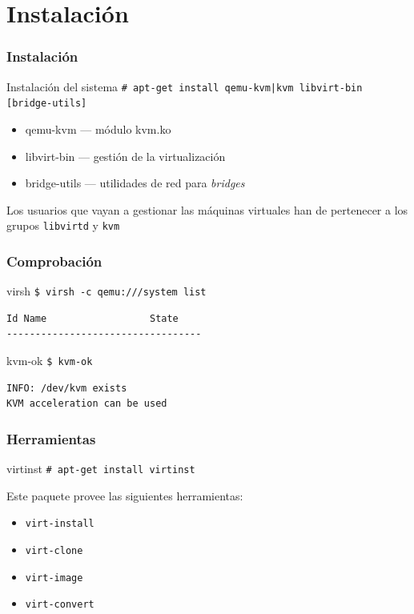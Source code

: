 \documentclass{beamer}
\begin{document}
\section{Instalación}

\begin{frame}
  \frametitle{Instalación}
  \begin{block}{Instalación del sistema}
    \texttt{\# apt-get install qemu-kvm|kvm libvirt-bin [bridge-utils]}
    \begin{itemize}
      \item qemu-kvm --- módulo kvm.ko
      \item libvirt-bin --- gestión de la virtualización
      \item bridge-utils --- utilidades de red para \textit{bridges}
    \end{itemize}
  \end{block}
  \bigskip
  Los usuarios que vayan a gestionar las máquinas virtuales han de pertenecer a los grupos \texttt{libvirtd} y \texttt{kvm}
\end{frame}

\begin{frame}[fragile]
  \frametitle{Comprobación}
  \begin{block}{virsh}
    \texttt{\$ virsh -c qemu:///system list} \\
    \small{\begin{verbatim}
Id Name                  State
----------------------------------
    \end{verbatim}}
  \end{block}
  \bigskip
  \begin{block}{kvm-ok}
    \texttt{\$ kvm-ok} \\
    \small{\begin{verbatim}
INFO: /dev/kvm exists
KVM acceleration can be used
    \end{verbatim}}
  \end{block}
\end{frame}

\begin{frame}
  \frametitle{Herramientas}
  \begin{block}{virtinst}
    \texttt{\# apt-get install virtinst}
  \end{block}
  Este paquete provee las siguientes herramientas:
  \begin{itemize}
    \item \texttt{virt-install}
    \item \texttt{virt-clone}
    \item \texttt{virt-image}
    \item \texttt{virt-convert}
  \end{itemize}
\end{frame}
\end{document}

